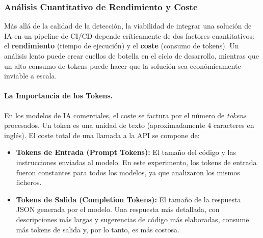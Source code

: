 \subsubsection{Análisis Cuantitativo de Rendimiento y Coste}

Más allá de la calidad de la detección, la viabilidad de integrar una solución de IA en un pipeline de CI/CD depende críticamente de dos factores cuantitativos: el \textbf{rendimiento} (tiempo de ejecución) y el \textbf{coste} (consumo de tokens). Un análisis lento puede crear cuellos de botella en el ciclo de desarrollo, mientras que un alto consumo de tokens puede hacer que la solución sea económicamente inviable a escala.

\paragraph{La Importancia de los Tokens.} En los modelos de IA comerciales, el coste se factura por el número de \textit{tokens} procesados. Un token es una unidad de texto (aproximadamente 4 caracteres en inglés). El coste total de una llamada a la API se compone de:
\begin{itemize}
    \item \textbf{Tokens de Entrada (Prompt Tokens):} El tamaño del código y las instrucciones enviadas al modelo. En este experimento, los tokens de entrada fueron constantes para todos los modelos, ya que analizaron los mismos ficheros.
    \item \textbf{Tokens de Salida (Completion Tokens):} El tamaño de la respuesta JSON generada por el modelo. Una respuesta más detallada, con descripciones más largas y sugerencias de código más elaboradas, consume más tokens de salida y, por lo tanto, es más costosa.
\end{itemize}

